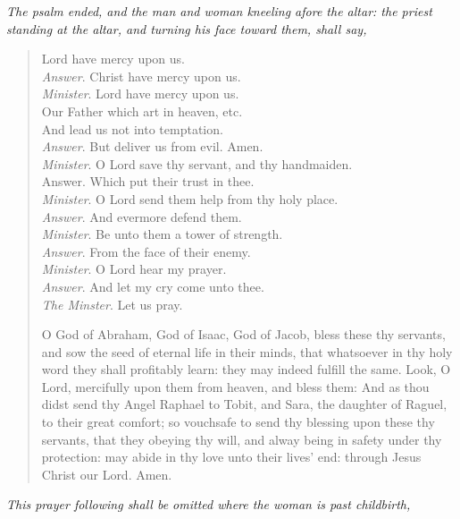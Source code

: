 \documentclass[
]{book}
\begin{document}
\emph{The psalm ended, and the man and woman kneeling afore the altar: the priest standing at the altar, and turning his face toward them, shall say,}

\begin{quote}
Lord have mercy upon us.\\
\emph{Answer}. Christ have mercy upon us.\\
\emph{Minister}. Lord have mercy upon us.\\
Our Father which art in heaven, etc.\\
And lead us not into temptation.\\
\emph{Answer}. But deliver us from evil. Amen.\\
\emph{Minister}. O Lord save thy servant, and thy handmaiden.\\
Answer. Which put their trust in thee.\\
\emph{Minister}. O Lord send them help from thy holy place.\\
\emph{Answer}. And evermore defend them.\\
\emph{Minister}. Be unto them a tower of strength.\\
\emph{Answer}. From the face of their enemy.\\
\emph{Minister}. O Lord hear my prayer.\\
\emph{Answer}. And let my cry come unto thee.\\
\emph{The Minster}. Let us pray.

O God of Abraham, God of Isaac, God of Jacob, bless these thy servants, and sow the seed of eternal life in their minds, that whatsoever in thy holy word they shall profitably learn: they may indeed fulfill the same. Look, O Lord, mercifully upon them from heaven, and bless them: And as thou didst send thy Angel Raphael to Tobit, and Sara, the daughter of Raguel, to their great comfort; so vouchsafe to send thy blessing upon these thy servants, that they obeying thy will, and alway being in safety under thy protection: may abide in thy love unto their lives' end: through Jesus Christ our Lord. Amen.
\end{quote}

\emph{This prayer following shall be omitted where the woman is past childbirth,}
\end{document}
